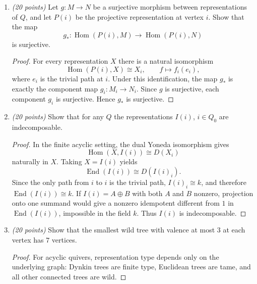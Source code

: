 \documentclass[11pt]{article}
\newcommand{\points}[1]{\textit{(#1 points)}}
\begin{document}
\begin{enumerate}[label=\arabic*., leftmargin=2em, itemsep=1.1em]
\begin{proof}
      If the projective resolution is minimal, then the map $P_0\twoheadrightarrow
      M$ is a projective cover. Its dual $D(M)\hookrightarrow D(P_0)$ is an
      essential monomorphism into an injective object: equivalently, if
      $a:D(P_0)\to D(P_0)$ satisfies $a|_{D(M)}=\operatorname{id}_{D(M)}$, then
      dualizing gives an endomorphism of $P_0$ over $M$, hence an automorphism by
      minimality of the projective cover. Thus $D(M)\hookrightarrow D(P_0)$ is an
      injective envelope, and the dual complex is the minimal injective resolution.
    \end{proof}

  \item \points{20} Let $g:M \to N$ be a surjective morphism between representations of
    $Q$, and let $P(i)$ be the projective representation at vertex $i$. Show that the map
    \[
      g_*:\operatorname{Hom}(P(i),M) \to \operatorname{Hom}(P(i),N)
    \]
    is surjective.
    \begin{proof}
      For every representation $X$ there is a natural isomorphism
      \[
        \operatorname{Hom}(P(i),X)\cong X_i,\qquad
        f\mapsto f_i(e_i),
      \]
      where $e_i$ is the trivial path at $i$. Under this identification, the map
      $g_*$ is exactly the component map $g_i:M_i\to N_i$. Since $g$ is
      surjective, each component $g_i$ is surjective. Hence $g_*$ is surjective.
    \end{proof}

  \item \points{20} Show that for any $Q$ the representations $I(i)$, $i \in Q_0$ are
    indecomposable.
    \begin{proof}
      In the finite acyclic setting, the dual Yoneda isomorphism gives
      \[
        \operatorname{Hom}(X,I(i))\cong D(X_i)
      \]
      naturally in $X$. Taking $X=I(i)$ yields
      \[
        \operatorname{End}(I(i))\cong D(I(i)_i).
      \]
      Since the only path from $i$ to $i$ is the trivial path, $I(i)_i\cong k$, and
      therefore $\operatorname{End}(I(i))\cong k$. If $I(i)=A\oplus B$ with both
      $A$ and $B$ nonzero, projection onto one summand would give a nonzero
      idempotent different from $1$ in $\operatorname{End}(I(i))$, impossible in
      the field $k$. Thus $I(i)$ is indecomposable.
    \end{proof}

  \item \points{20} Show that the smallest wild tree with valence at most $3$ at each
    vertex has $7$ vertices.
    \begin{proof}
      For acyclic quivers, representation type depends only on the underlying graph:
      Dynkin trees are finite type, Euclidean trees are tame, and all other connected
      trees are wild.


\end{proof}
\end{enumerate}
\end{document}
